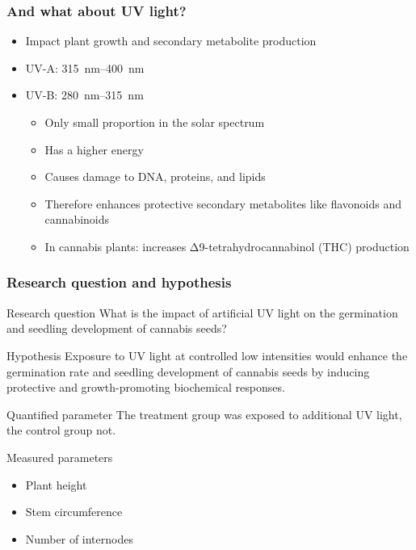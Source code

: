 \documentclass[
    12pt,
    aspectratio=1610,
    b,
    bibliography=../bibliography.bib,
    link-citations]{beamer}
\begin{document}
    \begin{frame}
        \frametitle{And what about UV light?}
        \begin{itemize}
            \item Impact plant growth and secondary metabolite production
            \item UV-A: \qtyrange[mode=text, range-phrase=\textendash, range-units=single]{315}{400}{\nm}
            \item UV-B: \qtyrange[mode=text, range-phrase=\textendash, range-units=single]{280}{315}{\nm}
            \begin{itemize}
                \item Only small proportion in the solar spectrum
                \item Has a higher energy
                \item Causes damage to DNA, proteins, and lipids
                \item Therefore enhances protective secondary metabolites like flavonoids and cannabinoids
                \item In cannabis plants: increases Δ9-tetrahydrocannabinol (THC) production
            \end{itemize}
        \end{itemize}
        \quad \autocite{eichhorn_bilodeau_update_2019, international_organization_for_standardization_space_2007, lydon_uv-b_1987}
    \end{frame}

    \begin{frame}
        \frametitle{Research question and hypothesis}
        \begin{footnotesize}
            \begin{block}{Research question}
                What is the impact of artificial UV light on the germination and seedling development of cannabis seeds?
            \end{block}
            \begin{block}{Hypothesis}
                Exposure to UV light at controlled low intensities would enhance the germination rate and seedling development of cannabis seeds by inducing protective and growth-promoting biochemical responses.
            \end{block}
            \begin{block}{Quantified parameter}
                The treatment group was exposed to additional UV light, the control group not.
            \end{block}
            \begin{block}{Measured parameters}
                \begin{itemize}
                    \item Plant height
                    \item Stem circumference
                    \item Number of internodes
                \end{itemize}
            \end{block}
        \end{footnotesize}
    \end{frame}
\end{document}
